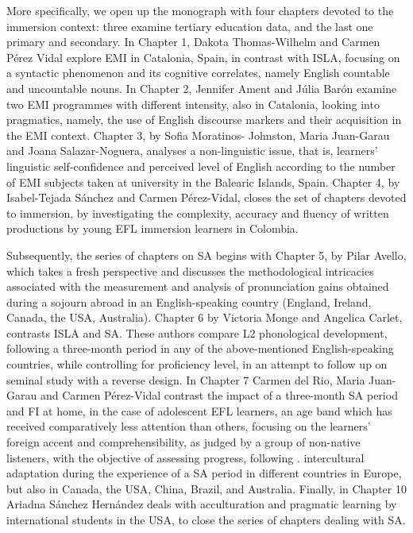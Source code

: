 More specifically, we open up the monograph with four chapters devoted to the immersion context: three examine tertiary education data, and the last one primary and secondary. In Chapter 1, Dakota Thomas-Wilhelm and Carmen Pérez Vidal explore EMI in Catalonia, Spain, in contrast with ISLA, focusing on a syntactic phenomenon and its cognitive correlates, namely English countable and uncountable nouns. In Chapter 2, Jennifer Ament and Júlia Barón examine two EMI programmes with different intensity, also in Catalonia, looking into pragmatics, namely, the use of English discourse markers and their acquisition in the EMI context. Chapter 3, by Sofia Moratinos- Johnston, Maria Juan-Garau and Joana Salazar-Noguera, analyses a non-linguistic issue, that is, learners’ linguistic self-confidence and perceived level of English according to the number of EMI subjects taken at university in the Balearic Islands, Spain. Chapter 4, by Isabel-Tejada Sánchez and Carmen Pérez-Vidal, closes the set of chapters devoted to immersion, by investigating the complexity, accuracy and fluency of written productions by young EFL immersion learners in Colombia.

Subsequently, the series of chapters on SA begins with Chapter 5, by Pilar Avello, which takes a fresh perspective and discusses the methodological intricacies associated with the measurement and analysis of pronunciation gains obtained during a sojourn abroad in an English-speaking country (England, Ireland, Canada, the USA, Australia). Chapter 6 by Victoria Monge and Angelica Carlet, contrasts ISLA and SA. These authors compare L2 phonological development, following a three-month period in any of the above-mentioned English-speaking countries, while controlling for proficiency level, in an attempt to follow up on  seminal study with a reverse design. In Chapter 7 Carmen del Rio, Maria Juan-Garau and Carmen Pérez-Vidal contrast the impact of a three-month SA period and FI at home, in the case of adolescent EFL learners, an age band which has received comparatively less attention than others, focusing on the learners’ foreign accent and comprehensibility, as judged by a group of non-native listeners, with the objective of assessing progress, following \citet{TrofimovichIsaacs2012}.  intercultural adaptation during the experience of a SA period in different countries in Europe, but also in Canada, the USA, China, Brazil, and Australia. Finally, in Chapter 10 Ariadna Sánchez Hernández deals with acculturation and pragmatic learning by international students in the USA, to close the series of chapters dealing with SA. 

